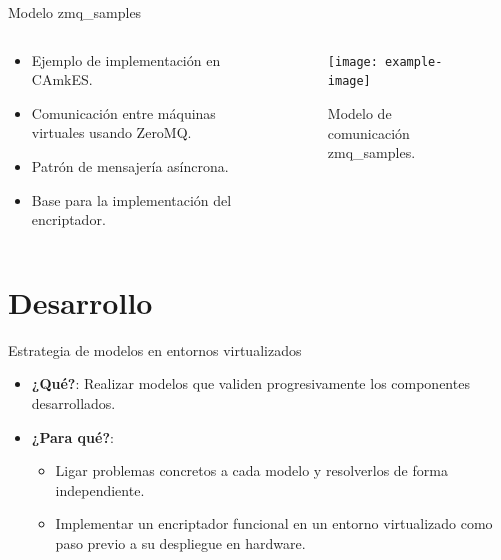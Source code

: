 \documentclass[serif, aspectratio=169]{beamer}
\begin{document}
\begin{frame}{Modelo zmq\_samples}
    \begin{columns}
        \begin{column}{0.5\textwidth}
            \begin{itemize}
                \item Ejemplo de implementación en CAmkES.
                \item Comunicación entre máquinas virtuales usando ZeroMQ.
                \item Patrón de mensajería asíncrona.
                \item Base para la implementación del encriptador.
            \end{itemize}
        \end{column}

        \begin{column}{0.5\textwidth}
            \begin{figure}
                \centering
                \texttt{[image: example-image]}
                \caption{Modelo de comunicación zmq\_samples.} 
            \end{figure}
        \end{column}
    \end{columns}
    
\end{frame}



\section{Desarrollo}

\begin{frame}{Estrategia de modelos en entornos virtualizados}
   \begin{itemize}
       \item \textbf{¿Qué?}: Realizar modelos que validen progresivamente los componentes desarrollados.
       \item \textbf{¿Para qué?}: 
       \begin{itemize}
        \item Ligar problemas concretos a cada modelo y resolverlos de forma independiente.
        \item Implementar un encriptador funcional en un entorno virtualizado como paso previo a su despliegue en hardware.
       \end{itemize}
       
   \end{itemize}
\end{frame}
\end{document}
